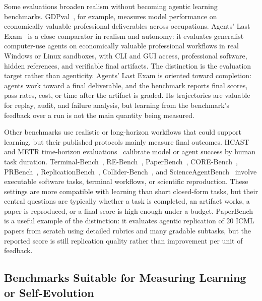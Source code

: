 Some evaluations broaden realism without becoming agentic learning benchmarks. GDPval~\cite{patwardhan2025gdpval}, for example, measures model performance on economically valuable professional deliverables across occupations. Agents' Last Exam~\cite{sun2026agentslastexam} is a close comparator in realism and autonomy: it evaluates generalist computer-use agents on economically valuable professional workflows in real Windows or Linux sandboxes, with CLI and GUI access, professional software, hidden references, and verifiable final artifacts. The distinction is the evaluation target rather than agenticity. Agents' Last Exam is oriented toward completion: agents work toward a final deliverable, and the benchmark reports final scores, pass rates, cost, or time after the artifact is graded. Its trajectories are valuable for replay, audit, and failure analysis, but learning from the benchmark's feedback over a run is not the main quantity being measured.

Other benchmarks use realistic or long-horizon workflows that could support learning, but their published protocols mainly measure final outcomes. HCAST~\cite{rein2025hcast} and METR time-horizon evaluations~\cite{kwa2025timehorizon} calibrate model or agent success by human task duration. Terminal-Bench~\cite{merrill2026terminalbench}, RE-Bench~\cite{wijk2024rebench}, PaperBench~\cite{starace2025paperbench}, CORE-Bench~\cite{siegel2024corebench}, PRBench~\cite{qiu2026prbench}, ReplicationBench~\cite{ye2025replicationbench}, Collider-Bench~\cite{faroughy2026colliderbench}, and ScienceAgentBench~\cite{chen2024scienceagentbench} involve executable software tasks, terminal workflows, or scientific reproduction. These settings are more compatible with learning than short closed-form tasks, but their central questions are typically whether a task is completed, an artifact works, a paper is reproduced, or a final score is high enough under a budget. PaperBench is a useful example of the distinction: it evaluates agentic replication of 20 ICML papers from scratch using detailed rubrics and many gradable subtasks, but the reported score is still replication quality rather than improvement per unit of feedback.

\subsection{Benchmarks Suitable for Measuring Learning or Self-Evolution}
\label{sec:additional-related-work-learning}


